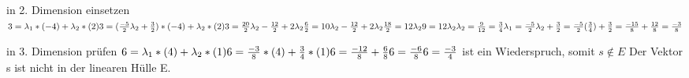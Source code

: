 \documentclass[10pt,ngerman]{scrartcl}
\begin{document}
\begin{enumerate}[1.]
\begin{enumerate}[(a)]
\begin{enumerate}
	in 2. Dimension einsetzen \newline
	\begin{math}
	3 = \lambda _1 * (-4) + \lambda _2 * (2) \newline
	3 = (\frac{-5}{2} \lambda _2 + \frac{3}{2}) * (-4) + \lambda _2 * (2) \newline
	3 = \frac{20}{2} \lambda _2 - \frac{12}{2} + 2\lambda _2  \newline
	\frac{6}{2} = 10 \lambda _2 - \frac{12}{2} + 2\lambda _2  \newline
	\frac{18}{2} = 12 \lambda _2 \newline
	9 = 12 \lambda _2 \newline
	\lambda _2 = \frac{9}{12} = \frac{3}{4}\newline
	\lambda _1 = \frac{-5}{2} \lambda _2 + \frac{3}{2} = \frac{-5}{2} (\frac{3}{4}) + \frac{3}{2} =
	\frac{-15}{8} + \frac{12}{8} = \frac{-3}{8}
	\end{math}
	
	in 3. Dimension prüfen \newline
	\begin{math}
	6 = \lambda _1 * (4) + \lambda _2 * (1) \newline
	6 = \frac{-3}{8} * (4) + \frac{3}{4} * (1) \newline
	6 = \frac{-12}{8} + \frac{6}{8} \newline
	6 = \frac{-6}{8} \newline
	6 = \frac{-3}{4} 
	\end{math} ist ein Wiederspruch, somit \begin{math}s \notin E \end{math}\newline
	Der Vektor s ist nicht in der linearen Hülle E.
	
	~\newline~
	

\end{enumerate}
\end{enumerate}
\end{enumerate}
\end{document}
